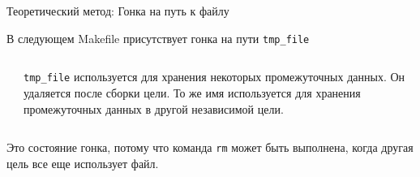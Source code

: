     \begin{frame}[label=current]{Теоретический метод: Гонка на путь к файлу}

        В следующем Makefile присутствует гонка на пути \texttt{tmp\_file}

        \begin{columns}[t]
            \begin{column}{.45 \textwidth}
                \newline
                
            \end{column}
            \begin{column}{.4 \textwidth}
                \newline \newline \newline \newline
                \texttt{tmp\_file} используется для хранения некоторых промежуточных данных.
                \newline
                Он удаляется после сборки цели.
                \newline \newline \newline
                То же имя используется для хранения
                \newline
                промежуточных данных в другой
                \newline
                независимой цели.
            \end{column}
        \end{columns}

        Это состояние гонка, потому что команда \texttt{rm} может быть выполнена, когда другая цель все еще использует файл.

    \end{frame}

